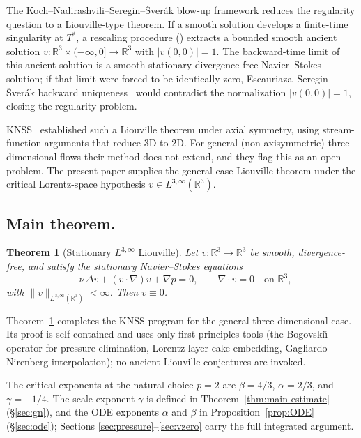 \documentclass[11pt]{amsart}
\newtheorem{theorem}{Theorem}[section]
\theoremstyle{definition}
\newcommand{\RR}{\mathbb{R}}
\newcommand{\Lweak}[1]{L^{3,\infty}(\RR^{#1})}
\newcommand{\norm}[1]{\|#1\|}
\newcommand{\abs}[1]{|#1|}
\begin{document}
The Koch--Nadirashvili--Seregin--\v{S}ver\'ak blow-up framework
\cite{KNSS} reduces the regularity question to a Liouville-type
theorem. If a smooth solution develops a finite-time singularity
at $T^*$, a rescaling procedure (\cite[\S6]{KNSS}) extracts a
bounded smooth ancient solution $v \colon \RR^3 \times
(-\infty, 0] \to \RR^3$ with $\abs{v(0, 0)} = 1$. The backward-time
limit of this ancient solution is a smooth stationary
divergence-free Navier--Stokes solution; if that limit were forced
to be identically zero, Escauriaza--Seregin--\v{S}ver\'ak backward
uniqueness~\cite{ESS03RMS} would contradict the normalization
$\abs{v(0, 0)} = 1$, closing the regularity problem.

KNSS~\cite[\S5]{KNSS} established such a Liouville theorem under
axial symmetry, using stream-function arguments that reduce 3D to
2D. For general (non-axisymmetric) three-dimensional flows their
method does not extend, and they flag this as an open problem.
The present paper supplies the general-case Liouville theorem
under the critical Lorentz-space hypothesis
$v \in L^{3,\infty}(\RR^3)$.

\subsection{Main theorem.}\label{ssec:main}

\begin{theorem}[Stationary $L^{3,\infty}$ Liouville]\label{thm:main}
Let $v \colon \RR^3 \to \RR^3$ be smooth, divergence-free, and
satisfy the stationary Navier--Stokes equations
\[
-\nu\,\Delta v + (v \cdot \nabla) v + \nabla p = 0,
\qquad \nabla \cdot v = 0
\quad \text{on } \RR^3,
\]
with $\norm{v}_{\Lweak{3}} < \infty$. Then $v \equiv 0$.
\end{theorem}

Theorem~\ref{thm:main} completes the KNSS program for the general
three-dimensional case. Its proof is self-contained and uses only
first-principles tools (the Bogovski\u{\i} operator for pressure
elimination, Lorentz layer-cake embedding, Gagliardo--Nirenberg
interpolation); no ancient-Liouville conjectures are invoked.

The critical exponents at the natural choice $p = 2$ are
$\beta = 4/3$, $\alpha = 2/3$, and $\gamma = -1/4$. The scale
exponent $\gamma$ is defined in
Theorem~\ref{thm:main-estimate} (\S\ref{sec:gn}), and the ODE
exponents $\alpha$ and $\beta$ in
Proposition~\ref{prop:ODE} (\S\ref{sec:ode}); Sections
\ref{sec:pressure}--\ref{sec:vzero} carry the full integrated
argument.
\end{document}
